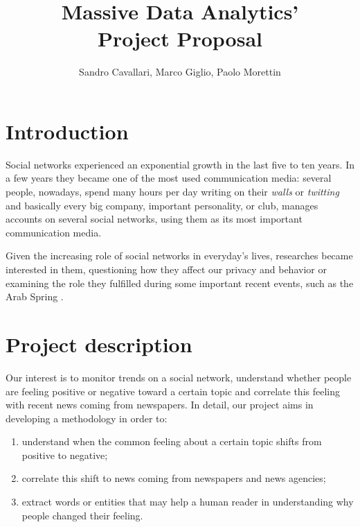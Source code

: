 \documentclass[a4paper]{article}
\begin{document}
\title{Massive Data Analytics'\\Project Proposal}
\author{Sandro Cavallari, Marco Giglio, Paolo Morettin}
\date{}
\maketitle

\section{Introduction}
Social networks experienced an exponential growth in the last five to ten years.
In a few years they became one of the most used communication media:
several people, nowadays, spend many hours per day writing on their
\emph{walls} or \emph{twitting} and basically every big company, important
personality, or club, manages accounts on several social networks, using them as
its most important communication media.

Given the increasing role of social networks in everyday's lives, researches
became interested in them, questioning how they affect our privacy and behavior
\cite{Debatin}\cite{Acar} or examining the role they fulfilled during some
important recent events, such as the Arab Spring \cite{Howard}\cite{Lotan}.

\section{Project description}
Our interest is to monitor trends on a social network, understand whether people
are feeling positive or negative toward a certain topic and correlate this
feeling with recent news coming from newspapers. In detail, our project aims in
developing a methodology in order to:
\begin{enumerate}
\item understand when the common feeling about a certain topic shifts from positive
to negative;
\item correlate this shift to news coming from newspapers and news agencies;
\item extract words or entities that may help a human reader in understanding
why people changed their feeling.
\end{enumerate}
\end{document}
